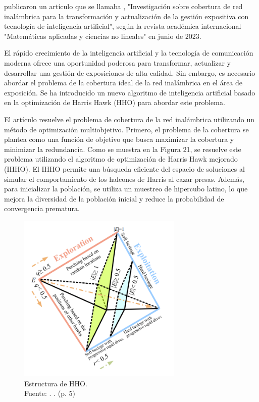 \newpage
\cite{pr_dou2023researchwir} publicaron un artículo que se llamaba , "Investigación sobre cobertura de red inalámbrica para la transformación y actualización de la gestión expositiva con tecnología de inteligencia artificial", según la revista académica internacional "Matemáticas aplicadas y ciencias no lineales" en junio de 2023.

El rápido crecimiento de la inteligencia artificial y la tecnología de comunicación moderna ofrece una oportunidad poderosa para transformar, actualizar y desarrollar una gestión de exposiciones de alta calidad. Sin embargo, es necesario abordar el problema de la cobertura ideal de la red inalámbrica en el área de exposición. Se ha introducido un nuevo algoritmo de inteligencia artificial basado en la optimización de Harris Hawk (HHO) para abordar este problema.

El artículo resuelve el problema de cobertura de la red inalámbrica utilizando un método de optimización multiobjetivo. Primero, el problema de la cobertura se plantea como una función de objetivo que busca maximizar la cobertura y minimizar la redundancia. Como se muestra en la Figura 21, se resuelve este problema utilizando el algoritmo de optimización de Harris Hawk mejorado (IHHO). El IHHO permite una búsqueda eficiente del espacio de soluciones al simular el comportamiento de los halcones de Harris al cazar presas. Además, para inicializar la población, se utiliza un muestreo de hipercubo latino, lo que mejora la diversidad de la población inicial y reduce la probabilidad de convergencia prematura.

\begin{figure}[!ht]
	\begin{center}
		\includegraphics[width=0.70\textwidth]{2/figures/dou2023.png}
		\caption[Estructura de HHO]{Estructura de HHO.\\
		Fuente: \cite{pr_dou2023researchwir}. . (p. 5)}
		\label{2:fig129}
	\end{center}
\end{figure}

